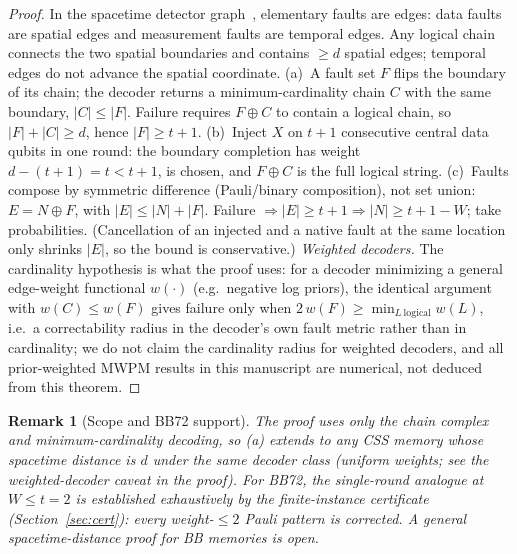 \documentclass[pdflatex,sn-mathphys-num]{sn-jnl}
\theoremstyle{thmstyleone}
\theoremstyle{thmstyletwo}
\newtheorem{remark}{Remark}
\theoremstyle{thmstylethree}
\begin{document}
\begin{proof}
In the spacetime detector graph~\cite{Dennis2002,Fowler2012}, elementary faults are edges: data faults are spatial edges and measurement faults are temporal edges. Any logical chain connects the two spatial boundaries and contains $\ge d$ spatial edges; temporal edges do not advance the spatial coordinate. (a)~A fault set $F$ flips the boundary of its chain; the decoder returns a minimum-cardinality chain $C$ with the same boundary, $|C|\le|F|$. Failure requires $F\oplus C$ to contain a logical chain, so $|F|+|C|\ge d$, hence $|F|\ge t{+}1$. (b)~Inject $X$ on $t{+}1$ consecutive central data qubits in one round: the boundary completion has weight $d-(t{+}1)=t<t{+}1$, is chosen, and $F\oplus C$ is the full logical string. (c)~Faults compose by symmetric difference (Pauli/binary composition), not set union: $E=N\oplus F$, with $|E|\le|N|+|F|$. Failure $\Rightarrow|E|\ge t{+}1\Rightarrow |N|\ge t{+}1-W$; take probabilities. (Cancellation of an injected and a native fault at the same location only shrinks $|E|$, so the bound is conservative.) \emph{Weighted decoders.} The cardinality hypothesis is what the proof uses: for a decoder minimizing a general edge-weight functional $w(\cdot)$ (e.g.\ negative log priors), the identical argument with $w(C)\le w(F)$ gives failure only when $2\,w(F)\ge \min_{L\ \mathrm{logical}} w(L)$, i.e.\ a correctability radius in the decoder's own fault metric rather than in cardinality; we do not claim the cardinality radius for weighted decoders, and all prior-weighted MWPM results in this manuscript are numerical, not deduced from this theorem.
\end{proof}

\begin{remark}[Scope and BB72 support]
The proof uses only the chain complex and minimum-cardinality decoding, so (a) extends to any CSS memory whose spacetime distance is $d$ under the same decoder class (uniform weights; see the weighted-decoder caveat in the proof). For BB72, the single-round analogue at $W\le t=2$ is established \emph{exhaustively} by the finite-instance certificate (Section~\ref{sec:cert}): every weight-$\le2$ Pauli pattern is corrected. A general spacetime-distance proof for BB memories is open.
\end{remark}
\end{document}
